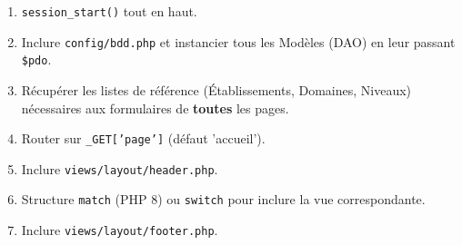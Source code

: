 \documentclass[11pt]{article}
\begin{document}
\begin{methode}
\begin{enumerate}
    \item \texttt{session\_start()} tout en haut.
    \item Inclure \texttt{config/bdd.php} et instancier tous les Modèles (DAO) en leur passant \texttt{\$pdo}.
    \item Récupérer les listes de référence (Établissements, Domaines, Niveaux) nécessaires aux formulaires de \textbf{toutes} les pages.
    \item Router sur \texttt{\_GET['page']} (défaut 'accueil').
    \item Inclure \texttt{views/layout/header.php}.
    \item Structure \texttt{match} (PHP 8) ou \texttt{switch} pour inclure la vue correspondante.
    \item Inclure \texttt{views/layout/footer.php}.
\end{enumerate}
\end{methode}
\end{document}
